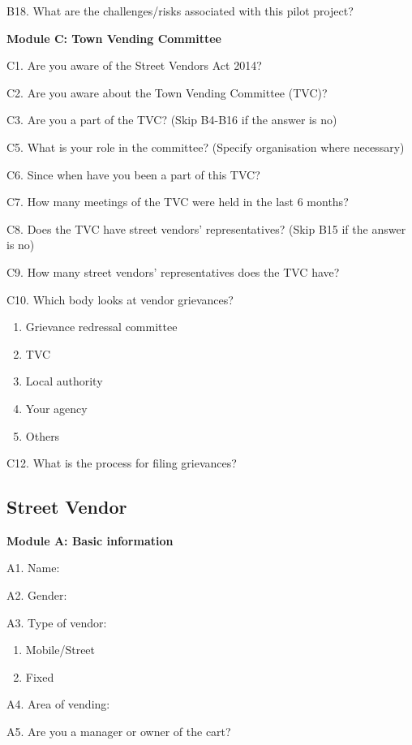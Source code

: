 \documentclass[a4paper, 12pt, twoside]{article}
\begin{document}
{{\begin{mdframed}[backgroundcolor=gray!20]
B18. What are the challenges/risks associated with this pilot project?

\textbf{Module C: Town Vending Committee}

C1. Are you aware of the Street Vendors Act 2014?

C2. Are you aware about the Town Vending Committee (TVC)?

C3. Are you a part of the TVC? (Skip B4-B16 if the answer is no)

C5. What is your role in the committee? (Specify organisation where necessary)

C6. Since when have you been a part of this TVC?

C7. How many meetings of the TVC were held in the last 6 months?

C8. Does the TVC have street vendors’ representatives? (Skip B15 if the answer is no)

C9. How many street vendors’ representatives does the TVC have?

C10. Which body looks at vendor grievances?
\begin{enumerate}
\item Grievance redressal committee
\item TVC
\item Local authority
\item Your agency
\item Others
\end{enumerate}

C12. What is the process for filing grievances?
\end{mdframed}

\begin{mdframed}[backgroundcolor=gray!20]
\subsection*{Street Vendor}

\textbf{Module A: Basic information}

A1. Name:

A2. Gender:

A3. Type of vendor:
\begin{enumerate}
\item Mobile/Street
\item Fixed
\end{enumerate}

A4. Area of vending:

A5. Are you a manager or owner of the cart?


\end{mdframed}}}
\end{document}

